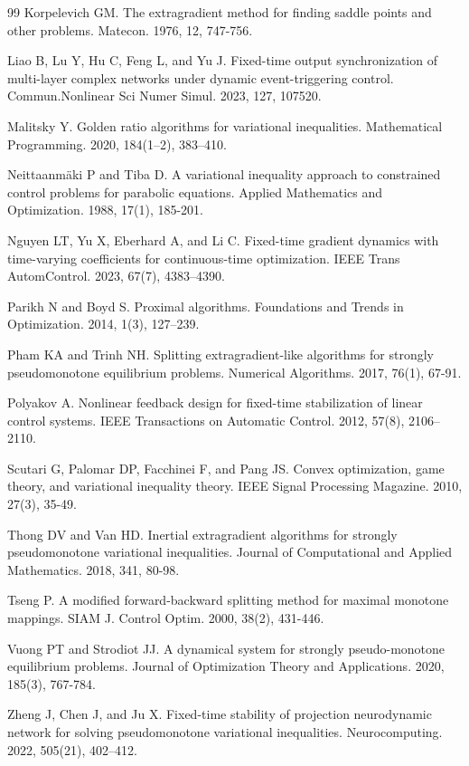 \documentclass{article}
\theoremstyle{plain}%
\theoremstyle{thmstyletwo}%
\theoremstyle{thmstylethree}%
\begin{document}
\begin{thebibliography}{99}
Korpelevich GM. The extragradient method for finding saddle points and other problems. Matecon. 1976, 12, 747-756.

Liao B, Lu Y, Hu C, Feng L, and Yu J. Fixed-time output synchronization of multi-layer complex networks under dynamic event-triggering control. Commun.Nonlinear Sci Numer Simul. 2023, 127, 107520.

Malitsky Y. Golden ratio algorithms for variational inequalities. Mathematical Programming. 2020, 184(1–2), 383–410. 

Neittaanmäki P and Tiba D. A variational inequality approach to constrained control problems for parabolic equations. Applied Mathematics and Optimization. 1988, 17(1), 185-201.

Nguyen LT, Yu X, Eberhard A, and Li C. Fixed-time gradient dynamics with time-varying coefficients for continuous-time optimization. IEEE Trans AutomControl. 2023, 67(7), 4383–4390.

Parikh N and Boyd S. Proximal algorithms. Foundations and Trends in Optimization. 2014, 1(3), 127–239.

Pham KA and Trinh NH. Splitting extragradient-like algorithms for strongly pseudomonotone equilibrium problems. Numerical Algorithms. 2017, 76(1), 67-91.

Polyakov A. Nonlinear feedback design for fixed-time stabilization of linear control systems. IEEE Transactions on Automatic Control. 2012, 57(8), 2106–2110.

Scutari G, Palomar DP, Facchinei F, and  Pang JS. Convex optimization, game theory, and variational inequality theory. IEEE Signal Processing Magazine. 2010, 27(3), 35-49.


Thong DV and Van HD. Inertial extragradient algorithms for strongly pseudomonotone variational inequalities. Journal of Computational and Applied Mathematics. 2018, 341, 80-98.

Tseng P. A modified forward-backward splitting method for maximal monotone mappings. SIAM J. Control Optim. 2000, 38(2), 431-446.

Vuong PT and Strodiot JJ. A dynamical system for strongly pseudo-monotone equilibrium problems. Journal of Optimization Theory and Applications. 2020, 185(3), 767-784.

Zheng J, Chen J, and Ju X. Fixed-time stability of projection neurodynamic network for solving pseudomonotone variational inequalities. Neurocomputing. 2022, 505(21), 402–412.


\end{thebibliography}
\end{document}
